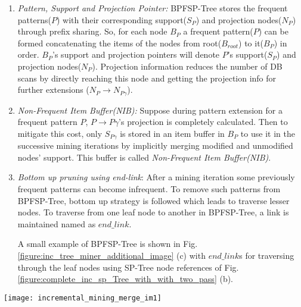 \begin{enumerate}
    \item \textit{Pattern, Support and Projection Pointer: }BPFSP-Tree stores the frequent patterns($P$) with their corresponding support($S_{P}$) and projection nodes($N_{P}$) through prefix sharing. So, for each node $B_{P}$ a frequent pattern($P$) can be formed concatenating the items of the nodes from root($B_{root}$) to it($B_{P}$) in order. $B_{P}$'s support and projection pointers will denote $P$'s support($S_{P}$) and projection nodes($N_{P}$). Projection information reduces the number of DB scans by directly reaching this node and getting the projection info for further extensions ($N_{P} \to N_{P\gamma}$).
    
    \item \textit{Non-Frequent Item Buffer(NIB): }Suppose during pattern extension for a frequent pattern $P$, $P \to P\gamma$'s projection is completely calculated. Then to mitigate this cost, only $S_{P\gamma}$ is stored in an item buffer in $B_{P}$ to use it in the successive mining iterations by implicitly merging modified and unmodified nodes' support. This buffer is called \textit{Non-Frequent Item Buffer(NIB)}.   
    
    \item \textit{Bottom up pruning using end-link}: After a mining iteration some previously frequent patterns can become infrequent. To remove such patterns from BPFSP-Tree, bottom up strategy is followed which leads to traverse lesser nodes. To traverse from one leaf node to another in BPFSP-Tree, a link is maintained named as $end\_link$.
    
     A small example of BPFSP-Tree is shown in Fig. \ref{figure:inc_tree_miner_additional_image} (c) with $end\_link$s for traversing through the leaf nodes using SP-Tree node references of Fig. \ref{figure:complete_inc_sp_Tree_with_with_two_pass} (b).
\end{enumerate}

\begin{figure*}[!tb]
\centering
\texttt{[image: incremental\_mining\_merge\_im1]}
\caption{(a) Pattern Generation Approach for IncTree-Miner, (b) Example of next links and modified next links, (c) Example of BPFSP-Tree, (d) Memory Resilient IncTree-Miner, (e) BPFSP-Tree for patterns with prefix $< c >$ after iteration 1 and 2 for $\delta=2, \delta^{\prime}=3$.} \label{figure:inc_tree_miner_additional_image}
\hfil
\end{figure*}

